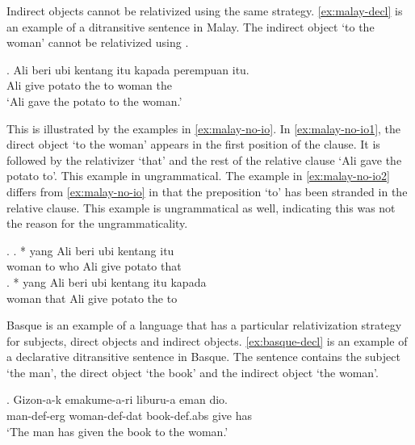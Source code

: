 Indirect objects cannot be relativized using the same strategy. \ref{ex:malay-decl} is an example of a ditransitive sentence in Malay. The indirect object  `to the woman' cannot be relativized using .

\exg. Ali beri {ubi kentang} itu kapada perempuan itu.\\
 Ali give potato the to woman the\\
 `Ali gave the potato to the woman.'\label{ex:malay-decl} 

This is illustrated by the examples in \ref{ex:malay-no-io}. In \ref{ex:malay-no-io1}, the direct object  `to the woman' appears in the first position of the clause. It is followed by the relativizer  `that' and the rest of the relative clause  `Ali gave the potato to'. This example in ungrammatical. The example in \ref{ex:malay-no-io2} differs from \ref{ex:malay-no-io} in that the preposition  `to' has been stranded in the relative clause. This example is ungrammatical as well, indicating this was not the reason for the ungrammaticality.

\ex.\label{ex:malay-no-io}
\ag. *  yang Ali beri {ubi kentang} itu\\
 woman to who Ali give potato that\\ \label{ex:malay-no-io1}
\bg. * yang Ali beri {ubi kentang} itu kapada\\
 woman that Ali give potato the to\\ \label{ex:malay-no-io2}

Basque is an example of a language that has a particular relativization strategy for subjects, direct objects and indirect objects. \ref{ex:basque-decl} is an example of a declarative ditransitive sentence in Basque. The sentence contains the subject  `the man', the direct object  `the book' and the indirect object  `the woman'.

\exg. Gizon-a-k emakume-a-ri liburu-a eman dio.\\
 man-\ac{def}-\ac{erg} woman-\ac{def}-\ac{dat} book-\ac{def}.\ac{abs} give has\\
 `The man has given the book to the woman.' \label{ex:basque-decl}

